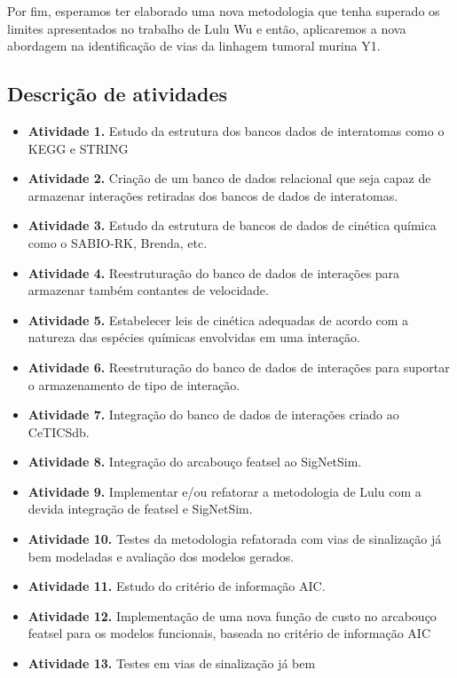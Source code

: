 \documentclass[12pt]{article}
\begin{document}
Por fim, esperamos ter elaborado uma nova metodologia que tenha superado
os limites apresentados no trabalho de Lulu Wu e então, aplicaremos a 
nova abordagem na identificação de vias da linhagem tumoral murina Y1.

\subsection{Descrição de atividades}
\begin{itemize}
    \item{\bf Atividade 1.} Estudo da estrutura dos bancos dados de 
        interatomas como o KEGG e STRING
    \item{\bf Atividade 2.} Criação de um banco de dados relacional que
        seja capaz de armazenar interações retiradas dos bancos de dados
        de interatomas.
    \item{\bf Atividade 3.} Estudo da estrutura de bancos de dados de 
        cinética química como o SABIO-RK, Brenda, etc.
    \item{\bf Atividade 4.} Reestruturação do banco de dados de 
        interações para armazenar também contantes de velocidade.
    \item{\bf Atividade 5.} Estabelecer leis de cinética adequadas
        de acordo com a natureza das espécies químicas envolvidas em uma
        interação.
    \item{\bf Atividade 6.} Reestruturação do banco de dados de 
        interações para suportar o armazenamento de tipo de interação.
    \item{\bf Atividade 7.} Integração do banco de dados de interações
        criado ao CeTICSdb.
    \item{\bf Atividade 8.} Integração do arcabouço featsel ao 
        SigNetSim.
    \item{\bf Atividade 9.} Implementar e/ou refatorar a metodologia de 
        Lulu com a devida integração de featsel e SigNetSim.
    \item{\bf Atividade 10.} Testes da metodologia refatorada com vias
        de sinalização já bem modeladas e avaliação dos modelos gerados.
    \item{\bf Atividade 11.} Estudo do critério de informação AIC.
    \item{\bf Atividade 12.} Implementação de uma nova função de custo
        no arcabouço featsel para os modelos funcionais, baseada no 
        critério de informação AIC
    \item{\bf Atividade 13.} Testes em vias de sinalização já bem 

\end{itemize}
\end{document}
